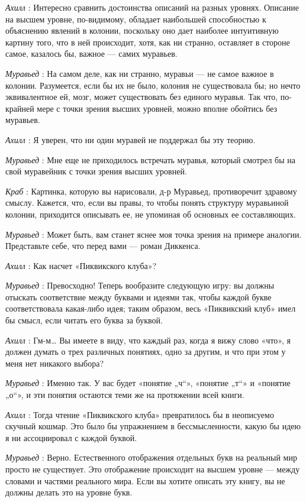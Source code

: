 \documentclass[../main.tex]{subfiles}
\begin{document}
\begin{dialogue}
\emph{Ахилл} : Интересно сравнить достоинства описаний на разных уровнях. Описание на высшем уровне, по-видимому, обладает наибольшей способностью к объяснению явлений в колонии, поскольку оно дает наиболее интуитивную картину того, что в ней происходит, хотя, как ни странно, оставляет в стороне самое, казалось бы, важное --- самих муравьев.

\emph{Муравьед} : На самом деле, как ни странно, муравьи --- не самое важное в колонии. Разумеется, если бы их не было, колония не существовала бы; но нечто эквивалентное ей, мозг, может существовать без единого муравья. Так что, по-крайней мере с точки зрения высших уровней, можно вполне обойтись без муравьев.

\emph{Ахилл} : Я уверен, что ни один муравей не поддержал бы эту теорию.

\emph{Муравьед} : Мне еще не приходилось встречать муравья, который смотрел бы на свой муравейник с точки зрения высших уровней.

\emph{Краб} : Картинка, которую вы нарисовали, д-р Муравьед, противоречит здравому смыслу. Кажется, что, если вы правы, то чтобы понять структуру муравьиной колонии, приходится описывать ее, не упоминая об основных ее составляющих.

\emph{Муравьед} : Может быть, вам станет яснее моя точка зрения на примере аналогии. Представьте себе, что перед вами --- роман Диккенса.

\emph{Ахилл} : Как насчет «Пиквикского клуба»?

\emph{Муравьед} : Превосходно! Теперь вообразите следующую игру: вы должны отыскать соответствие между буквами и идеями так, чтобы каждой букве соответствовала какая-либо идея; таким образом, весь «Пиквикский клуб» имел бы смысл, если читать его буква за буквой.

\emph{Ахилл} : Гм-м\ldots{} Вы имеете в виду, что каждый раз, когда я вижу слово «что», я должен думать о трех различных понятиях, одно за другим, и что при этом у меня нет никакого выбора?

\emph{Муравьед} : Именно так. У вас будет «понятие „ч``», «понятие „т``» и «понятие „о``», и эти понятия остаются теми же на протяжении всей книги.

\emph{Ахилл} : Тогда чтение «Пиквикского клуба» превратилось бы в неописуемо скучный кошмар. Это было бы упражнением в бессмысленности, какую бы идею я ни ассоциировал с каждой буквой.

\emph{Муравьед} : Верно. Естественного отображения отдельных букв на реальный мир просто не существует. Это отображение происходит на высшем уровне --- между словами и частями реального мира. Если вы хотите описать эту книгу, вы не должны делать это на уровне букв.


\end{dialogue}
\end{document}
